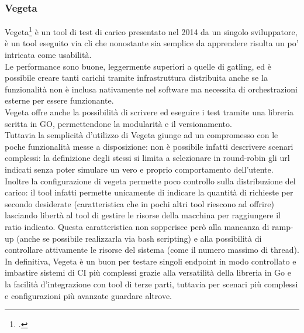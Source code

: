 \subsubsection{Vegeta}
Vegeta\footcite{site:vegeta} è un tool di test di carico presentato nel 2014 da un singolo sviluppatore, è un tool eseguito via \gls{cli} che nonostante sia semplice da apprendere risulta un po' intricata come usabilità. \\
Le performance sono buone, leggermente superiori a quelle di gatling, ed è possibile creare tanti carichi tramite infrastruttura distribuita anche se la funzionalità non è inclusa nativamente nel software ma necessita di orchestrazioni esterne per essere funzionante. \\
Vegeta offre anche la possibilità di scrivere ed eseguire i test tramite una libreria scritta in GO, permettendone la modularità e il versionamento. \\
Tuttavia la semplicità d’utilizzo di Vegeta giunge ad un compromesso con le poche funzionalità messe a disposizione: non è possibile infatti descrivere scenari complessi: la definizione degli stessi si limita a selezionare in round-robin gli url indicati senza poter simulare un vero e proprio comportamento dell'utente. \\
Inoltre la configurazione di vegeta permette poco controllo sulla distribuzione del carico: il tool infatti permette unicamente di indicare la quantità di richieste per secondo desiderate (caratteristica che in pochi altri tool riescono ad offrire) lasciando libertà al tool di gestire le risorse della macchina per raggiungere il ratio indicato. Questa caratteristica non sopperisce però alla mancanza di ramp-up (anche se possibile realizzarla via bash scripting) e alla possibilità di controllare attivamente le risorse del sistema (come il numero massimo di thread). \\
In definitiva, Vegeta è un buon per testare singoli endpoint in modo controllato e imbastire sistemi di CI più complessi grazie alla versatilità della libreria in Go e la facilità d’integrazione con tool di terze parti, tuttavia per scenari più complessi e configurazioni più avanzate guardare altrove.
